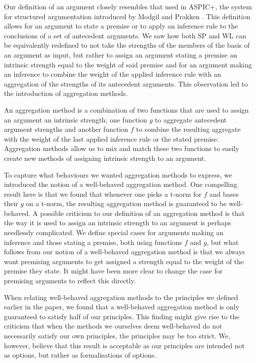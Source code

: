 \documentclass[runningheads]{llncs}
\begin{document}
Our definition of an argument closely resembles that used in ASPIC+, the system for structured argumentation introduced by Modgil and Prakken \cite{DBLP:journals/argcom/ModgilP14}. This definition allows for an argument to state a premise or to apply an inference rule to the conclusions of a set of antecedent arguments. We saw how both SP and WL can be equivalently redefined to not take the strengths of the members of the basis of an argument as input, but rather to assign an argument stating a premise an intrinsic strength equal to the weight of said premise and for an argument making an inference to combine the weight of the applied inference rule with an aggregation of the strengths of its antecedent arguments. This observation led to the introduction of aggregation methods.

An aggregation method is a combination of two functions that are used to assign an argument an intrinsic strength; one function $g$ to aggregate antecedent argument strengths and another function $f$ to combine the resulting aggregate with the weight of the last applied inference rule or the stated premise. Aggregation methods allow us to mix and match these two functions to easily create new methods of assigning intrinsic strength to an argument.

To capture what behaviours we wanted aggregation methods to express, we introduced the notion of a well-behaved aggregation method. One compelling result here is that we found that whenever one picks a t-norm for $f$ and bases their $g$ on a t-norm, the resulting aggregation method is guaranteed to be well-behaved. A possible criticism to our definition of an aggregation method is that the way it is used to assign an intrinsic strength to an argument is perhaps needlessly complicated. We define special cases for arguments making an inference and those stating a premise, both using functions $f$ and $g$, but what follows from our notion of a well-behaved aggregation method is that we always want premising arguments to get assigned a strength equal to the weight of the premise they state. It might have been more clear to change the case for premising arguments to reflect this directly.

When relating well-behaved aggregation methods to the principles we defined earlier in the paper, we found that a well-behaved aggregation method is only guaranteed to satisfy half of our principles. This finding might give rise to the criticism that when the methods we ourselves deem well-behaved do not necessarily satisfy our own principles, the principles may be too strict. We, however, believe that this result is acceptable as our principles are intended not as options, but rather as formalisations of options.
\end{document}
